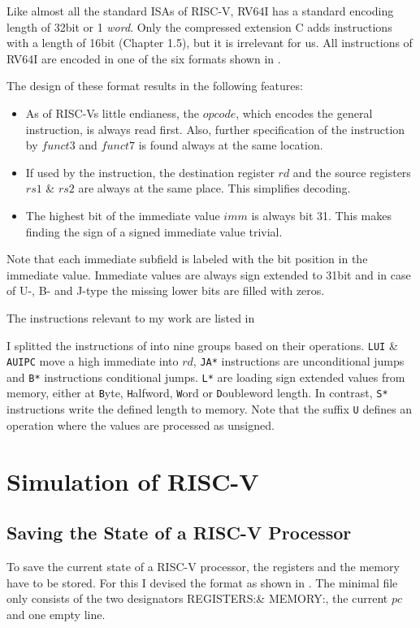 Like almost all the standard ISAs of RISC-V, RV64I has a standard encoding
length of 32bit or 1 \emph{word}. Only the compressed extension C adds
instructions with a length of 16bit \cite{riscv-isa}(Chapter 1.5), but it is
irrelevant for us. All instructions of RV64I are encoded in one of the six
formats shown in .



The design of these format results in the following features:
\begin{itemize}
      \item As of RISC-Vs little endianess, the $opcode$, which encodes the general
            instruction, is always read first. Also, further specification of the
            instruction by $funct3$ and $funct7$ is found always at the same location.
      \item If used by the instruction, the destination register $rd$ and the source
            registers $rs1$ \& $rs2$ are always at the same place. This simplifies
            decoding.
      \item The highest bit of the immediate value $imm$ is always bit 31. This makes
            finding the sign of a signed immediate value trivial.
\end{itemize}
Note that each immediate subfield is labeled with the bit position in the immediate value.
Immediate values are always sign extended to 31bit and in case of U-, B- and J-type the missing lower bits are filled with zeros.

The instructions relevant to my work are listed in

I splitted the instructions of  into nine groups based on their operations.
\texttt{LUI} \& \texttt{AUIPC} move a high immediate into $rd$, \texttt{JA*} instructions are unconditional jumps and \texttt{B*} instructions conditional jumps.
\texttt{L*} are loading sign extended values from memory, either at \texttt{B}yte, \texttt{H}alfword, \texttt{W}ord or \texttt{D}oubleword length.
In contrast, \texttt{S*} instructions write the defined length to memory.
Note that the suffix \texttt{U} defines an operation where the values are processed as unsigned.

\section{Simulation of RISC-V}

\subsection{Saving the State of a RISC-V Processor}\label{statefile}
To save the current state of a RISC-V processor, the registers and the memory have to be stored.
For this I devised the format as shown in . The minimal file only consists of the two designators \dq REGISTERS:\dq \& \dq MEMORY:\dq, the current $pc$ and one empty line.
